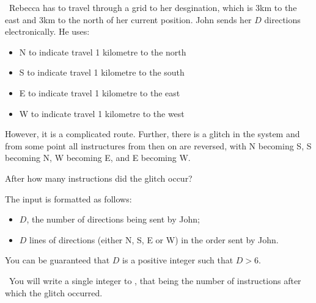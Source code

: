
\Question\ Rebecca has to travel through a grid to her desgination, which is 3km
to the east and 3km to the north of her current position. John sends her $D$ directions
electronically. He uses:

\begin{itemize}
    \item N to indicate travel 1 kilometre to the north
    \item S to indicate travel 1 kilometre to the south
    \item E to indicate travel 1 kilometre to the east
    \item W to indicate travel 1 kilometre to the west
\end{itemize}

However, it is a complicated route. Further, there is a glitch in the system and
from some point all instructures from then on are reversed, with N becoming S, 
S becoming N, W becoming E, and E becoming W.

After how many instructions did the glitch occur?

\Input

The input is formatted as follows:
\begin{itemize}
    \item $D$, the number of directions being sent by John;
    \item $D$ lines of directions (either N, S, E or W) in the order sent by John.
\end{itemize}

You can be guaranteed that $D$ is a positive integer such that $D > 6$.

\Output\ You will write a single integer to \OUT, that being the number of instructions
after which the glitch occurred.

\Sample

